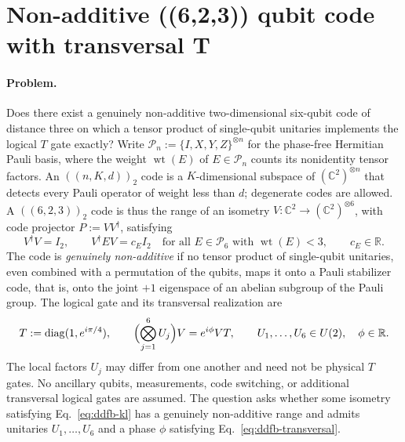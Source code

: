 \section{Non-additive ((6,2,3)) qubit code with transversal T}
\label{sec:op_ddfbbe7ca0ead0c8}

\paragraph{Problem.}
Does there exist a genuinely non-additive two-dimensional six-qubit code of
distance three on which a tensor product of single-qubit unitaries implements
the logical $T$ gate exactly?  Write $\mathcal P_n:=\{I,X,Y,Z\}^{\otimes n}$
for the phase-free Hermitian Pauli basis, where the weight
$\operatorname{wt}(E)$ of $E\in\mathcal P_n$ counts its nonidentity tensor
factors.  An $((n,K,d))_2$ code is a $K$-dimensional subspace of
$(\mathbb C^2)^{\otimes n}$ that detects every Pauli operator of weight less
than $d$; degenerate codes are allowed.  A $((6,2,3))_2$ code is thus the range
of an isometry $V:\mathbb C^2\to(\mathbb C^2)^{\otimes6}$, with code projector
$P:=VV^\dagger$, satisfying
\begin{equation}
  V^\dagger V=I_2,
  \qquad
  V^\dagger EV=c_EI_2
  \quad\text{for all }E\in\mathcal P_6\text{ with }\operatorname{wt}(E)<3,
  \qquad c_E\in\mathbb R.
  \label{eq:ddfb-kl}
\end{equation}
The code is \emph{genuinely non-additive} if no tensor product of single-qubit
unitaries, even combined with a permutation of the qubits, maps it onto a Pauli
stabilizer code, that is, onto the joint $+1$ eigenspace of an abelian subgroup
of the Pauli group.  The logical gate and its transversal realization are
\begin{equation}
  T:=\operatorname{diag}(1,e^{i\pi/4}),
  \qquad
  \Bigl(\bigotimes_{j=1}^{6}U_j\Bigr)V=e^{i\phi}VT,
  \qquad U_1,\ldots,U_6\in U(2),\quad \phi\in\mathbb R.
  \label{eq:ddfb-transversal}
\end{equation}
The local factors $U_j$ may differ from one another and need not be physical
$T$ gates.  No ancillary qubits, measurements, code switching, or additional
transversal logical gates are assumed.  The question asks whether some
isometry satisfying Eq.~\eqref{eq:ddfb-kl} has a genuinely non-additive range
and admits unitaries $U_1,\ldots,U_6$ and a phase $\phi$ satisfying
Eq.~\eqref{eq:ddfb-transversal}.

